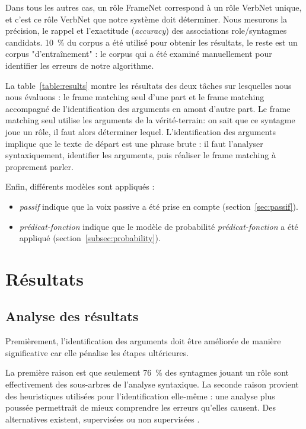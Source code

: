 Dans tous les autres cas, un rôle FrameNet correspond à un rôle VerbNet unique,
et c'est ce rôle VerbNet que notre système doit déterminer. Nous mesurons la
précision, le rappel et l'exactitude (\emph{accuracy}) des associations
role/syntagmes candidats.  10~\% du corpus a été utilisé pour obtenir les
résultats, le reste est un corpus "d'entraînement" : le corpus qui a été
examiné manuellement pour identifier les erreurs de notre algorithme.

La table~\ref{table:results} montre les résultats des deux tâches sur
lesquelles nous nous évaluons : le frame matching seul d'une part et le frame
matching accompagné de l'identification des arguments en amont d'autre part. Le
frame matching seul utilise les arguments de la vérité-terrain: on sait que ce
syntagme joue un rôle, il faut alors déterminer lequel. L'identification des
arguments implique que le texte de départ est une phrase brute : il faut
l'analyser syntaxiquement, identifier les arguments, puis réaliser le frame
matching à proprement parler.

Enfin, différents modèles sont appliqués :

\begin{itemize}

    \item \emph{passif} indique que la voix passive a été prise en compte
    (section~\ref{sec:passif}).

    \item \emph{prédicat-fonction} indique que le modèle de probabilité
    \emph{prédicat-fonction} a été appliqué (section~\ref{subsec:probability}).

\end{itemize}

\section{Résultats}

\subsection{Analyse des résultats}

Premièrement, l'identification des arguments doit être améliorée de manière
significative car elle pénalise les étapes ultérieures.

La première raison est que seulement 76~\% des syntagmes jouant un rôle sont
effectivement des sous-arbres de l'analyse syntaxique.
La seconde raison provient des heuristiques utilisées pour l'identification
elle-même : une analyse plus poussée permettrait de mieux comprendre les
erreurs qu'elles causent. Des alternatives existent, supervisées ou non
supervisées \citep{abend2009unsupervised}.

